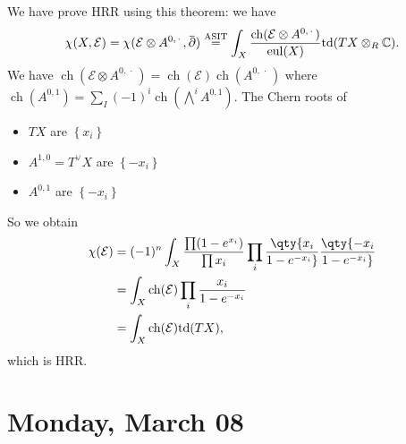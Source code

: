 \begin{example}[?]

We have prove HRR using this theorem: we have
\begin{align*}
\chi(X, \mathcal{E} ) = \chi( \mathcal{E} \otimes A^{0, {\,\cdot\,}}, \mkern 1.5mu\overline{\mkern-1.5mu{\partial}\mkern-1.5mu}\mkern 1.5mu) \overset{\text{ASIT}}{=} \int_X { \operatorname{ch}(\mathcal{E} \otimes A^{0, {\,\cdot\,}} ) \over {\operatorname{eul}}(X) } \mathrm{td}(TX \otimes_R {\mathbb{C}})
.\end{align*}
We have
\(\operatorname{ch}( \mathcal{E} \otimes A^{0, {\,\cdot\,}} ) = \operatorname{ch}(\mathcal{E}) \operatorname{ch}( A^{0, {\,\cdot\,}} )\)
where
\(\operatorname{ch}(A^{0, 1}) = \sum_I (-1)^i \operatorname{ch}(\bigwedge^i A^{0, 1} )\).
The Chern roots of

\begin{itemize}
\tightlist
\item
  \(TX\) are \(\left\{{ x_i }\right\}\)\\
\item
  \(A^{1, 0} = T^\vee X\) are \(\left\{{ -x_i }\right\}\)\\
\item
  \(A^{0, 1}\) are \(\left\{{ -x_i }\right\}\)
\end{itemize}

So we obtain
\begin{align*}
\chi( \mathcal{E} ) 
&= (-1)^n \int_X {\prod ( 1- e^{x_i}) \over \prod x_i}
\prod_i 
\qty{x_i \over 1 - e^{-x_i}} 
\qty{-x_i \over 1 - e^{-x_i}} \\
&= \int_X \operatorname{ch}( \mathcal{E} ) \prod_i {x_i \over 1-e^{-x_i} } \\
&= \int_X \operatorname{ch}( \mathcal{E} ) \mathrm{td}(TX)
,\end{align*}
which is HRR.

\end{example}

\hypertarget{monday-march-08}{%
\section{Monday, March 08}\label{monday-march-08}}

